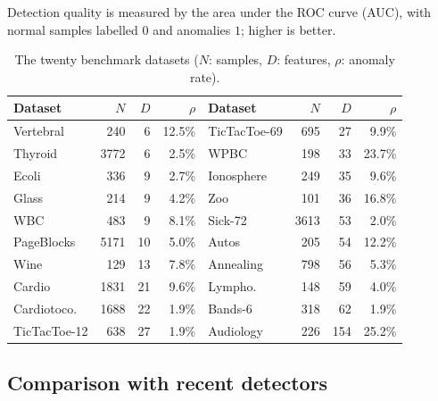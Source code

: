 \documentclass[times, review, 10pt]{elsarticle}
\begin{document}
Detection quality is measured by the area under the ROC curve (AUC), with normal
samples labelled $0$ and anomalies $1$; higher is better.

\begin{table}[t]
\centering
\caption{The twenty benchmark datasets ($N$: samples, $D$: features,
$\rho$: anomaly rate).}
\label{tab:datasets}
\small
\setlength{\tabcolsep}{5pt}
\begin{tabular}{lrrr@{\hskip 18pt}lrrr}
\toprule
Dataset & $N$ & $D$ & $\rho$ & Dataset & $N$ & $D$ & $\rho$\\
\midrule
Vertebral    & 240  & 6   & 12.5\% & TicTacToe-69 & 695  & 27  & 9.9\%\\
Thyroid      & 3772 & 6   & 2.5\%  & WPBC         & 198  & 33  & 23.7\%\\
Ecoli        & 336  & 9   & 2.7\%  & Ionosphere   & 249  & 35  & 9.6\%\\
Glass        & 214  & 9   & 4.2\%  & Zoo          & 101  & 36  & 16.8\%\\
WBC          & 483  & 9   & 8.1\%  & Sick-72      & 3613 & 53  & 2.0\%\\
PageBlocks   & 5171 & 10  & 5.0\%  & Autos        & 205  & 54  & 12.2\%\\
Wine         & 129  & 13  & 7.8\%  & Annealing    & 798  & 56  & 5.3\%\\
Cardio       & 1831 & 21  & 9.6\%  & Lympho.      & 148  & 59  & 4.0\%\\
Cardiotoco.  & 1688 & 22  & 1.9\%  & Bands-6      & 318  & 62  & 1.9\%\\
TicTacToe-12 & 638  & 27  & 1.9\%  & Audiology    & 226  & 154 & 25.2\%\\
\bottomrule
\end{tabular}
\end{table}

\subsection{Comparison with recent detectors}
\label{subsec:exp-comparison}
\end{document}

